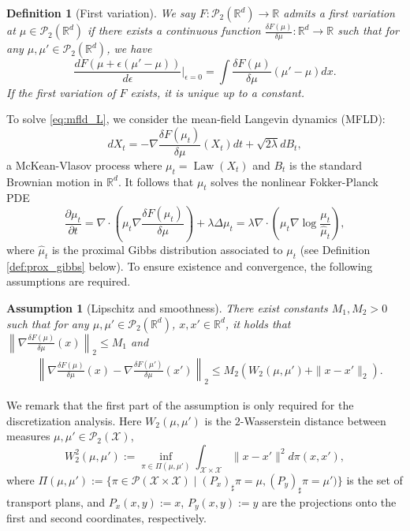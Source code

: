 \documentclass{article}
\newtheorem{definition}{Definition}
\newtheorem{assumption}{Assumption}
\begin{document}
\begin{definition}[First variation]
We say $F:\mathcal{P}_2(\mathbb{R}^d)\to\mathbb{R}$ admits a first variation at $\mu\in \mathcal{P}_2(\mathbb{R}^d)$ if there exists a continuous function $\frac{\delta F(\mu)}{\delta\mu}:\mathbb{R}^d\to\mathbb{R}$ such that for any $\mu,\mu'\in\mathcal{P}_2(\mathbb{R}^d)$, we have 
    \begin{equation}
        \frac{dF(\mu + \epsilon(\mu' - \mu))}{d\epsilon}\bigg|_{\epsilon=0} = \int \frac{\delta F(\mu)}{\delta\mu}(\mu'-\mu)dx. \label{eq:first_variation}
    \end{equation}
    If the first variation of $F$ exists, it is unique up to a constant.
\end{definition}
To solve \eqref{eq:mfld_L}, we consider the mean-field Langevin dynamics (MFLD): \begin{equation}\label{eq:mfld_sde}
    dX_t = -\nabla \frac{\delta F(\mu_t)}{\delta\mu}(X_t)dt + \sqrt{2\lambda}dB_t,
\end{equation}
a McKean-Vlasov process where $\mu_t = \operatorname{Law}(X_t)$ and $B_t$ is the standard Brownian motion in $\mathbb{R}^d$. It follows that $\mu_t$ solves the nonlinear Fokker-Planck PDE 
\begin{equation}\label{eq:mfld_pde}
    \frac{\partial\mu_t}{\partial t} = \nabla \cdot \left(\mu_t \nabla \frac{\delta F(\mu_t)}{\delta \mu}\right) + \lambda\Delta \mu_t = \lambda \nabla \cdot\left(\mu_t \nabla\log \frac{\mu_t}{\hat{\mu}_t}\right),
\end{equation}
where $\hat{\mu}_t$ is the proximal Gibbs distribution associated to $\mu_t$ (see Definition \ref{def:prox_gibbs} below).
To ensure existence and convergence, the following assumptions are required.
\begin{assumption}[Lipschitz and smoothness]\label{asmp:smoothness}
 There exist constants $M_1,M_2>0$ such that for any $\mu,\mu'\in\mathcal{P}_2(\mathbb{R}^d)$, $x, x'\in\mathbb{R}^d$, it holds that $\left\|\nabla \frac{\delta F(\mu)}{\delta\mu}(x)\right\|_2\le M_1$ and
 \begin{align*}
     &\left\|\nabla \frac{\delta F(\mu)}{\delta \mu}(x) - \nabla \frac{\delta F(\mu')}{\delta\mu}(x')\right\|_2\le M_2(W_2(\mu,\mu') + \|x-x'\|_2).
 \end{align*}
 \end{assumption}
We remark that the first part of the assumption is only required for the discretization analysis. Here $W_2(\mu,\mu')$ is the $2$-Wasserstein distance between measures $\mu,\mu'\in\mathcal{P}_2(\mathcal{X})$, \[
W_2^2(\mu,\mu') := \inf_{\pi\in\Pi(\mu,\mu')}\int_{\mathcal{X}\times\mathcal{X}}\|x-x'\|^2d\pi(x,x'),\] where $\Pi(\mu,\mu') := \{\pi\in\mathcal{P}(\mathcal{X}\times\mathcal{X})\mid (P_x)_\sharp \pi = \mu,(P_y)_\sharp\pi = \mu')\}$ is the set of transport plans, and $P_x(x,y):= x$, $P_y(x,y) := y$ are the projections onto the first and second coordinates, respectively. 
\end{document}
